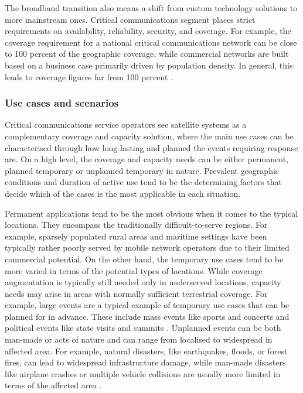 \documentclass[english, 12pt, a4paper, elec, utf8, a-1b, online]{aaltothesis}
\begin{document}
The broadband transition also means a shift from custom technology solutions to more mainstream ones. Critical communications segment places strict requirements on availability, reliability, security, and coverage. For example, the coverage requirement for a national critical communications network can be close to 100 percent of the geographic coverage, while commercial networks are built based on a business case primarily driven by population density. In general, this leads to coverage figures far from 100 percent \cite{saynevirta2021satellite}.

\subsubsection{Use cases and scenarios}

Critical communications service operators see satellite systems as a complementary coverage and capacity solution, where the main use cases can be characterised through how long lasting and planned the events requiring response are.
On a high level, the coverage and capacity needs can be either permanent, planned temporary or unplanned temporary in nature.
Prevalent geographic conditions and duration of active use tend to be the determining factors that decide which of the cases is the most applicable in each situation.

Permanent applications tend to be the most obvious when it comes to the typical locations. They encompass the traditionally difficult-to-serve regions.
For example, sparsely populated rural areas and maritime settings have been typically rather poorly served by mobile network operators due to their limited commercial potential.
On the other hand, the temporary use cases tend to be more varied in terms of the potential types of locations. While coverage augmentation is typically still needed only in underserved locations, capacity needs may arise in areas with normally sufficient terrestrial coverage.
For example, large events are a typical example of temporary use cases that can be planned for in advance. These include mass events like sports and concerts and political events like state visits and summits \cite{erve2018trump, tcca2021airbus, airbus2023bahrain}.
Unplanned events can be both man-made or acts of nature and can range from localised to widespread in affected area. For example, natural disasters, like earthquakes, floods, or forest fires, can lead to widespread infrastructure damage, while man-made disasters like airplane crashes or multiple vehicle collisions are usually more limited in terms of the affected area \cite{firstnet2021wildfire, firstnet2021nashville}.
\end{document}
